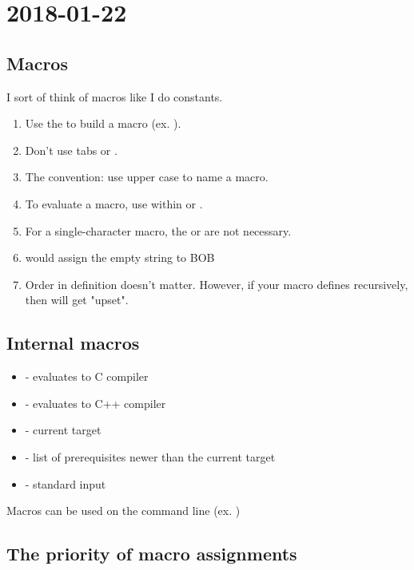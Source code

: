 \section{2018-01-22}

\subsection{Macros}

I sort of think of macros like I do constants.

\begin{enumerate}
  \item Use the \shellcmd{=} to build a macro (ex. ).
  \item Don't use tabs or \shellcmd{:}.
  \item The convention: use upper case to name a macro.
  \item To evaluate a macro, use within \shellcmd{\$\{----\}} or \shellcmd{\$(----)}.
  \item For a single-character macro, the \shellcmd{\{\}} or \shellcmd{()} are not necessary.
  \item {} would assign the empty string to BOB
  \item Order in definition doesn't matter. However, if your macro defines recursively, then  will get "upset".
\end{enumerate}

\subsection{Internal macros}

\begin{itemize}
  \item {} - evaluates to C compiler
  \item {} - evaluates to C++ compiler
  \item {} - current target
  \item {} - list of prerequisites newer than the current target
  \item \shellcmd{\$<} - standard input
\end{itemize}

Macros can be used on the command line (ex. )

\subsection{The priority of macro assignments}
 
